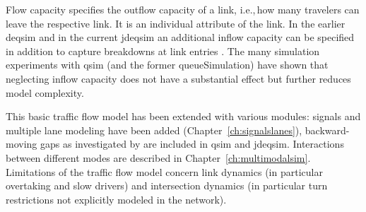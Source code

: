 Flow capacity specifies the outflow capacity of a link, i.e.,\,how many travelers can leave the respective link. It is an individual attribute of the link. In the earlier \gls{deqsim} and in the current \gls{jdeqsim} an additional inflow capacity can be specified in addition to capture breakdowns at link entries \citep[][p.~99]{Charypar_PhDThesis_2008}. The many simulation experiments with \gls{qsim} (and the former queueSimulation) have shown that neglecting inflow capacity does not have a substantial effect but further reduces model complexity. 

This basic traffic flow model has been extended with various modules: signals and multiple lane modeling have been added (Chapter~\ref{ch:signalslanes}), backward-moving gaps as investigated by \citet[][]{Charypar_PhDThesis_2008} are included in \gls{qsim} and \gls{jdeqsim}. Interactions between different modes are described in Chapter~\ref{ch:multimodalsim}. Limitations of the traffic flow model concern link dynamics (in particular overtaking and slow drivers) and intersection dynamics (in particular turn restrictions not explicitly modeled in the network). 


